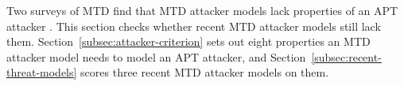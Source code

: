 \documentclass{cshonours}
\begin{document}
Two surveys of MTD find that MTD attacker models lack properties of an APT
attacker \citep{cho2020, jalowski2026}. This section checks whether recent
MTD attacker models still lack them. Section~\ref{subsec:attacker-criterion}
sets out eight properties an MTD attacker model needs to model an APT
attacker, and Section~\ref{subsec:recent-threat-models} scores three
recent MTD attacker models on them.
\end{document}
